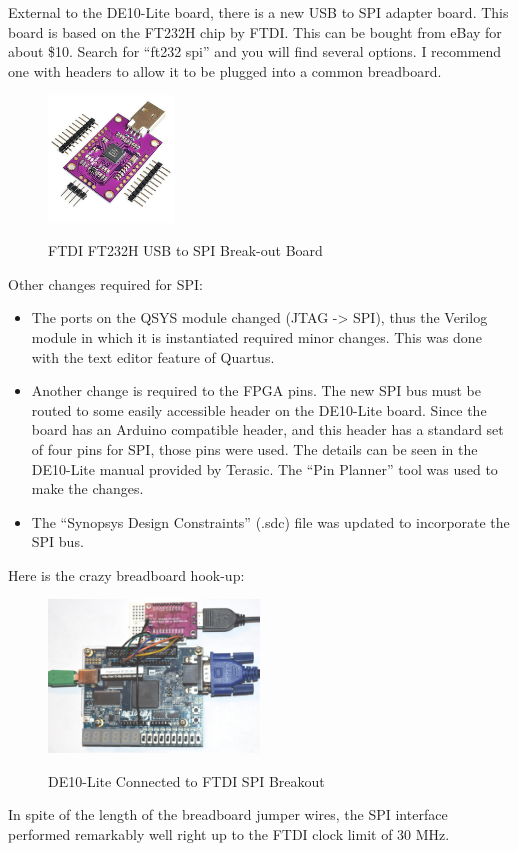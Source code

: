 External to the DE10-Lite board, there is a new USB to SPI adapter board.  This board is based on the FT232H chip by FTDI.  This can be bought from eBay for about \$10.  Search for ``ft232 spi'' and you will find several options.  I recommend one with headers to allow it to be plugged into a common breadboard.

\begin{figure}[ht]
	\centering
	\includegraphics[width=0.3\textwidth]{images/ftdi.jpg}
	\centering\bfseries
	\caption{FTDI FT232H USB to SPI Break-out Board}
\end{figure}

Other changes required for SPI:

\begin{itemize}
	\item The ports on the QSYS module changed (JTAG -> SPI), thus the Verilog module in which it is instantiated required minor changes.  This was done with the text editor feature of Quartus.
    \item Another change is required to the FPGA pins.  The new SPI bus must be routed to some easily accessible header on the DE10-Lite board.  Since the board has an Arduino compatible header, and this header has a standard set of four pins for SPI, those pins were used.  The details can be seen in the DE10-Lite manual provided by Terasic.  The ``Pin Planner'' tool was used to make the changes.
    \item The ``Synopsys Design Constraints'' (.sdc) file was updated to incorporate the SPI bus.
\end{itemize}

Here is the crazy breadboard hook-up:

\begin{figure}[h]
	\centering
	\includegraphics[width=0.5\textwidth]{images/de10_spi}
	\centering\bfseries
	\caption{DE10-Lite Connected to FTDI SPI Breakout}
\end{figure}

In spite of the length of the breadboard jumper wires, the SPI interface performed remarkably well right up to the FTDI clock limit of 30 MHz.









